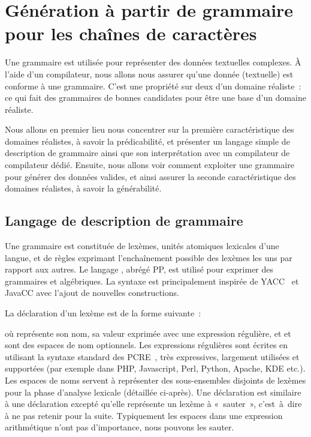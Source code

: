 \section{Génération à partir de grammaire pour les chaînes de caractères}
\label{section:data:strings}

Une grammaire est utilisée pour représenter des données textuelles complexes.  À
l'aide d'un compilateur, nous allons nous assurer qu'une donnée (textuelle) est
conforme à une grammaire. C'est une propriété sur deux d'un domaine réaliste~:
ce qui fait des grammaires de bonnes candidates pour être une base d'un domaine
réaliste.

Nous allons en premier lieu nous concentrer sur la première caractéristique des
domaines réalistes, à savoir la prédicabilité, et présenter un langage simple de
description de grammaire ainsi que son interprétation avec un compilateur de
compilateur dédié. Ensuite, nous allons voir comment exploiter une grammaire
pour générer des données valides, et ainsi assurer la seconde caractéristique
des domaines réalistes, à savoir la générabilité.

\subsection{Langage de description de grammaire}
\label{subsection:data:pp}

Une grammaire est constituée de {\strong lexèmes}, unités atomiques lexicales
d'une langue, et de {\strong règles} exprimant l'enchaînement possible des
lexèmes les uns par rapport aux autres. Le langage ,
abrégé PP, est utilisé pour exprimer des grammaires  et
algébriques. La syntaxe est principalement inspirée de YACC~ et
JavaCC avec l'ajout de nouvelles constructions.

La déclaration d'un lexème est de la forme suivante~:

\begin{pre}
\end{pre}
%
où  représente son nom,  sa valeur exprimée avec une
expression régulière, et  et  sont des espaces
de nom optionnels. Les expressions régulières sont écrites en utilisant la
syntaxe standard des PCRE~, très expressives, largement utilisées
et supportées (par exemple dans PHP, Javascript, Perl, Python, Apache, KDE
etc.). Les espaces de noms servent à représenter des sous-ensembles disjoints de
lexèmes pour la phase d'analyse lexicale (détaillée ci-après). Une déclaration
 est similaire à une déclaration  excepté qu'elle
représente un lexème à «~sauter~», c'est~à~dire à ne pas retenir pour la suite.
Typiquement les espaces dans une expression arithmétique n'ont pas d'importance,
nous pouvons les sauter.

